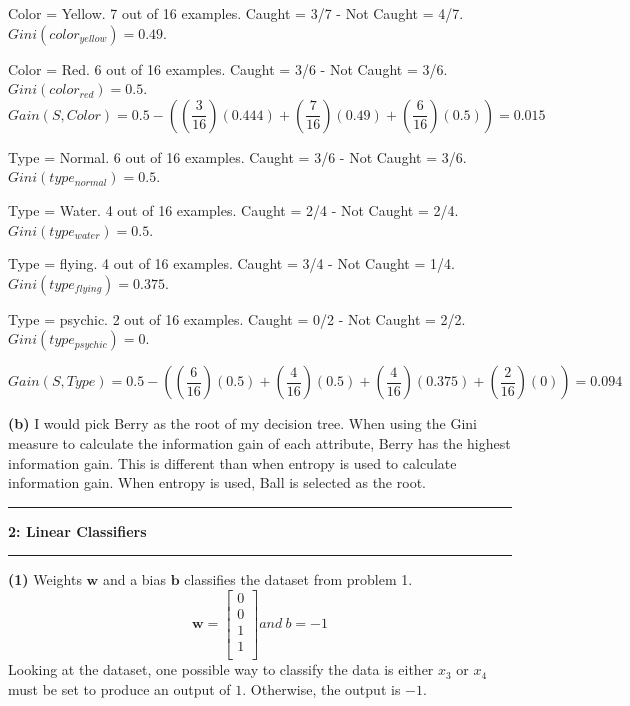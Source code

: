 \documentclass[11pt]{article}
\newcommand\question[2]{\vspace{.25in}\hrule\textbf{#1: #2}\vspace{.5em}\hrule\vspace{.10in}}
\renewcommand\part[1]{\vspace{.10in}\textbf{(#1)}}
\begin{document}
Color = Yellow. 7 out of 16 examples. Caught = 3/7 - Not Caught = 4/7. $Gini(color_{yellow}) = 0.49$.

Color = Red. 6 out of 16 examples. Caught = 3/6 - Not Caught = 3/6. $Gini(color_{red}) = 0.5$.
$$Gain(S, Color) = 0.5 - ((\frac{3}{16})(0.444) + (\frac{7}{16})(0.49) + (\frac{6}{16})(0.5)) = 0.015$$

 \par 

Type = Normal. 6 out of 16 examples. Caught = 3/6 - Not Caught = 3/6. $Gini(type_{normal}) = 0.5$.

Type = Water. 4 out of 16 examples. Caught = 2/4 - Not Caught = 2/4. $Gini(type_{water}) = 0.5$.

Type = flying. 4 out of 16 examples. Caught = 3/4 - Not Caught = 1/4. $Gini(type_{flying}) = 0.375$.

Type = psychic. 2 out of 16 examples. Caught = 0/2 - Not Caught = 2/2. $Gini(type_{psychic}) = 0$.

$$Gain(S, Type) = 0.5 - ((\frac{6}{16})(0.5) + (\frac{4}{16})(0.5) + (\frac{4}{16})(0.375) + (\frac{2}{16})(0)) = 0.094$$

 \par 



\qquad \part{b} I would pick Berry as the root of my decision tree. When using the Gini measure to calculate the information gain of each attribute, Berry has the highest information gain. This is different than when entropy is used to calculate information gain. When entropy is used, Ball is selected as the root.

\newpage
\question{2}{Linear Classifiers}

\part{1} Weights $\mathbf{w}$ and a bias $\mathbf{b}$ classifies the dataset from problem 1.
$$
\mathbf{w} = \begin{bmatrix}
0 \\
0 \\
1 \\
1 \\ 	
\end{bmatrix}
 and \ b = -1
$$
Looking at the dataset, one possible way to classify the data is either $x_3$ or $x_4$ must be set to produce an output of $1$. Otherwise, the output is $-1$.
\end{document}
